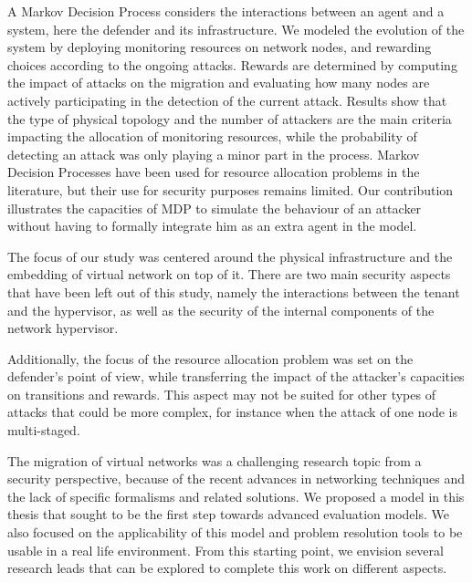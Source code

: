 A Markov Decision Process considers the interactions between an agent and a system, here the defender and its infrastructure. We modeled the evolution of the system by deploying monitoring resources on network nodes, and rewarding choices according to the ongoing attacks.
Rewards are determined by computing the impact of attacks on the migration and evaluating how many nodes are actively participating in the detection of the current attack.
Results show that the type of physical topology and the number of attackers are the main criteria impacting the allocation of monitoring resources, while the probability of detecting an attack was only playing a minor part in the process. 
Markov Decision Processes have been used for resource allocation problems in the literature, but their use for security purposes remains limited. Our contribution illustrates the capacities of MDP to simulate the behaviour of an attacker without having to formally integrate him as an extra agent in the model.

The focus of our study was centered around the physical infrastructure and the embedding of virtual network on top of it.
There are two main security aspects that have been left out of this study, namely the interactions between the tenant and the hypervisor, as well as the security of the internal components of the network hypervisor.

Additionally, the focus of the resource allocation problem was set on the defender's point of view, while transferring the impact of the attacker's capacities on transitions and rewards. This aspect may not be suited for other types of attacks that could be more complex, for instance when the attack of one node is multi-staged.

The migration of virtual networks was a challenging research topic from a security perspective, because of the recent advances in networking techniques and the lack of specific formalisms and related solutions. We proposed a model in this thesis that sought to be the first step towards advanced evaluation models. We also focused on the applicability of this model and problem resolution tools to be usable in a real life environment. From this starting point, we envision several research leads that can be explored to complete this work on different aspects.

